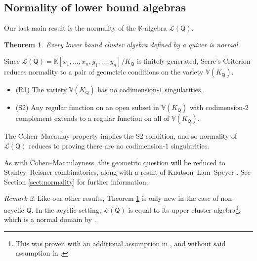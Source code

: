 \documentclass[10pt]{amsart}
\numberwithin{equation}{section}
\newtheorem{thm}{Theorem}[section]
\theoremstyle{definition}
\theoremstyle{remark}
\newtheorem{rem}[thm]{Remark}
\renewcommand{\L}{\mathcal{L}}%
\newcommand{\1}{^{-1}}
\def\Q{\mathsf{Q}}
\begin{document}
\subsection{Normality of lower bound algebras}

Our last main result is the normality of the $\mathbb{K}$-algebra $\L(\Q)$.

\begin{thm}\label{thm:normalityOfLowerBounds}
Every lower bound cluster algebra defined by a quiver is normal.
\end{thm}

Since $\L(\Q)= \mathbb{K}[x_1,\dots,x_n,y_1,\dots,y_n]/K_\Q$ is finitely-generated, Serre's Criterion reduces normality to a pair of geometric conditions on the variety $\mathbb{V}(K_\Q)$.
\begin{itemize}
	\item (R1) The variety $\mathbb{V}(K_\Q)$ has no codimension\--$1$ singularities.
	\item (S2) Any regular function on an open subset in $\mathbb{V}(K_\Q)$ with codimension\--$2$ complement extends to a regular function on all of $\mathbb{V}(K_\Q)$.
\end{itemize}
The Cohen--Macaulay property implies the S2 condition, and so normality of $\L(\Q)$ reduces to proving there are no codimension\--$1$ singularities.  

As with Cohen--Macaulayness, this geometric question will be reduced to Stanley--Reisner combinatorics, along  with a result of Knutson--Lam--Speyer \cite[Proposition 8.1]{KLS-Richardson}. See Section \ref{sect:normality} for further information.

%
%

\begin{rem}
Like our other results, Theorem \ref{thm:normalityOfLowerBounds} is only new in the case of non-acyclic $\Q$. In the acyclic setting, $\L(\Q)$ is equal to its upper cluster algebra\footnote{This was proven with an additional assumption in \cite[Thm. 1.18]{BFZ05}, and without said assumption in \cite{MulAU}.},  which is a normal domain by \cite[Prop. 2.1]{MulLA}.
\end{rem}
\end{document}
